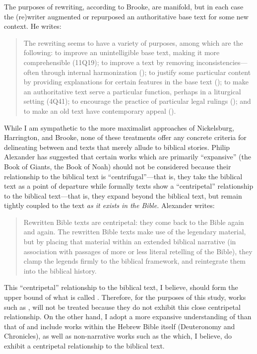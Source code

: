 The purposes of rewriting, according to Brooke, are manifold, but in each case the (re)writer augmented or repurposed an authoritative base text for some new context. He writes: 

\begin{quote}
    The rewriting seems to have a variety of purposes, among which are the following: to improve an unintelligible base text, making it more comprehensible (11Q19); to improve a text by removing inconsistencies---often through internal harmonization (); to justify some particular content by providing explanations for certain features in the base text (); to make an authoritative text serve a particular function, perhaps in a liturgical setting (4Q41); to encourage the practice of particular legal rulings (\jub); and to make an old text have contemporary appeal (\templescroll).\autocite[778]{brooke_schiffman-vanderkam2000}
\end{quote} 

While I am sympathetic to the more maximalist approaches of Nickelsburg, Harrington, and Brooke, none of these treatments offer any concrete criteria for delineating between \rwb and texts that merely allude to biblical stories. Philip Alexander has suggested that certain works which are primarily ``expansive'' (the Book of Giants, the Book of Noah) should not be considered \rwb because their relationship to the biblical text is ``centrifugal''---that is, they take the biblical text as a point of departure while formally \rwb texts show a ``centripetal'' relationship to the biblical text---that is, they expand beyond the biblical text, but remain tightly coupled to the text \emph{as it exists in the Bible.} Alexander writes: 

\begin{quote}
    Rewritten Bible texts are centripetal: they come back to the Bible again and again. The rewritten Bible texts make use of the legendary material, but by placing that material within an extended biblical narrative (in association with passages of more or less literal retelling of the Bible), they clamp the legends firmly to the biblical framework, and reintegrate them into the biblical history. \autocite[117]{alexander_carson-williamson1988}
\end{quote} 

This ``centripetal'' relationship to the biblical text, I believe, should form the upper bound of what is called \rwb. Therefore, for the purposes of this study, works such as \firstenoch, will not be treated because they do not exhibit this close centripetal relationship. On the other hand, I adopt a more expansive understanding of \rwb than that of \vermes and include works within the Hebrew Bible itself (Deuteronomy and Chronicles), as well as non-narrative works such as the \templescroll which, I believe, do exhibit a centripetal relationship to the biblical text. 

